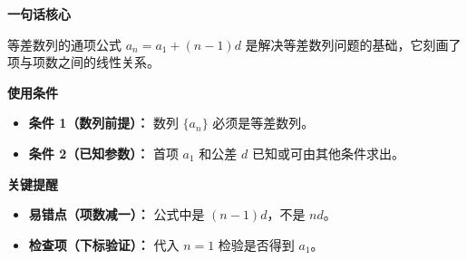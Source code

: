 \begin{summarybox}
	\textbf{\textcolor{CSummary}{一句话核心}}

	等差数列的通项公式 $a_n = a_1 + (n-1)d$ 是解决等差数列问题的基础，它刻画了项与项数之间的线性关系。

	\medskip
	\textbf{\textcolor{CSummary}{使用条件}}
	\begin{itemize}[leftmargin=*, itemsep=0.5em, topsep=0.4em]
		\item \textbf{条件 1（数列前提）：} 数列 $\{a_n\}$ 必须是等差数列。
		\item \textbf{条件 2（已知参数）：} 首项 $a_1$ 和公差 $d$ 已知或可由其他条件求出。
	\end{itemize}

	\medskip
	\textbf{\textcolor{CSummary}{关键提醒}}
	\begin{itemize}[leftmargin=*, itemsep=0.5em, topsep=0.4em]
		\item \textbf{易错点（项数减一）：} 公式中是 $(n-1)d$，不是 $n d$。
		\item \textbf{检查项（下标验证）：} 代入 $n=1$ 检验是否得到 $a_1$。
	\end{itemize}
\end{summarybox}
